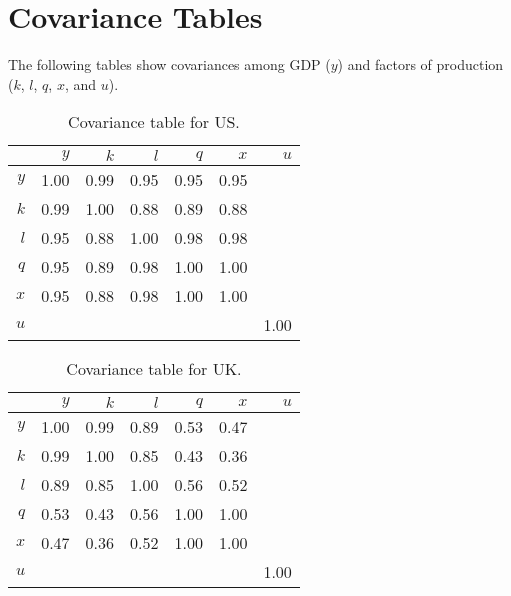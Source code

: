 \documentclass[preprint,authoryear,12pt]{elsarticle}\usepackage{graphicx, color}
\begin{document}
\appendix

\section{Covariance Tables}
\setcounter{table}{0} %

The following tables show covariances among GDP ($y$) and factors of production ($k$, $l$, $q$, $x$, and $u$).

\begin{table}[H]
\begin{center}
\caption{Covariance table for US.}
\label{tab:Covariance_US}
{\tiny
\begin{tabular}{rrrrrrr}
  \hline
 & $y$ & $k$ & $l$ & $q$ & $x$ & $u$ \\ 
  \hline
$y$ & 1.00 & 0.99 & 0.95 & 0.95 & 0.95 &  \\ 
  $k$ & 0.99 & 1.00 & 0.88 & 0.89 & 0.88 &  \\ 
  $l$ & 0.95 & 0.88 & 1.00 & 0.98 & 0.98 &  \\ 
  $q$ & 0.95 & 0.89 & 0.98 & 1.00 & 1.00 &  \\ 
  $x$ & 0.95 & 0.88 & 0.98 & 1.00 & 1.00 &  \\ 
  $u$ &  &  &  &  &  & 1.00 \\ 
   \hline
\end{tabular}
}
\end{center}
\end{table}
\begin{table}[H]
\begin{center}
\caption{Covariance table for UK.}
\label{tab:Covariance_UK}
{\tiny
\begin{tabular}{rrrrrrr}
  \hline
 & $y$ & $k$ & $l$ & $q$ & $x$ & $u$ \\ 
  \hline
$y$ & 1.00 & 0.99 & 0.89 & 0.53 & 0.47 &  \\ 
  $k$ & 0.99 & 1.00 & 0.85 & 0.43 & 0.36 &  \\ 
  $l$ & 0.89 & 0.85 & 1.00 & 0.56 & 0.52 &  \\ 
  $q$ & 0.53 & 0.43 & 0.56 & 1.00 & 1.00 &  \\ 
  $x$ & 0.47 & 0.36 & 0.52 & 1.00 & 1.00 &  \\ 
  $u$ &  &  &  &  &  & 1.00 \\ 
   \hline
\end{tabular}
}
\end{center}
\end{table}
\end{document}
